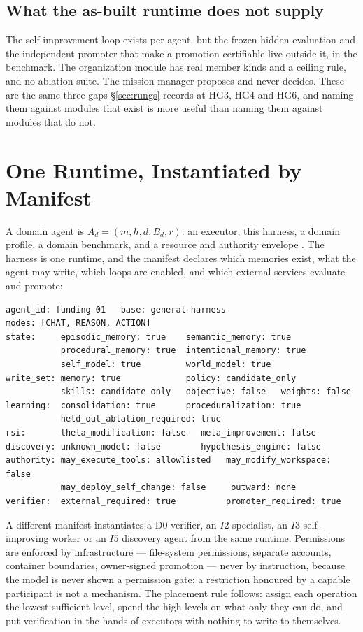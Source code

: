 \documentclass[11pt]{article}
\theoremstyle{definition}
\begin{document}
\subsection{What the as-built runtime does not supply}

The self-improvement loop exists per agent, but the frozen hidden evaluation and the independent promoter that make a promotion certifiable live outside it, in the benchmark. The organization module has real member kinds and a ceiling rule, and no ablation suite. The mission manager proposes and never decides. These are the same three gaps \S\ref{sec:rungs} records at HG3, HG4 and HG6, and naming them against modules that exist is more useful than naming them against modules that do not.

\section{One Runtime, Instantiated by Manifest}\label{sec:manifest}

A domain agent is $A_d = (m, h, d, B_d, r)$: an executor, this harness, a domain profile, a domain benchmark, and a resource and authority envelope \citep{yang2026plan}. The harness is one runtime, and the manifest declares which memories exist, what the agent may write, which loops are enabled, and which external services evaluate and promote:

{\small\begin{verbatim}
agent_id: funding-01   base: general-harness
modes: [CHAT, REASON, ACTION]
state:     episodic_memory: true    semantic_memory: true
           procedural_memory: true  intentional_memory: true
           self_model: true         world_model: true
write_set: memory: true             policy: candidate_only
           skills: candidate_only   objective: false   weights: false
learning:  consolidation: true      proceduralization: true
           held_out_ablation_required: true
rsi:       theta_modification: false   meta_improvement: false
discovery: unknown_model: false        hypothesis_engine: false
authority: may_execute_tools: allowlisted   may_modify_workspace: false
           may_deploy_self_change: false     outward: none
verifier:  external_required: true          promoter_required: true
\end{verbatim}}

A different manifest instantiates a D0 verifier, an $I2$ specialist, an $I3$ self-improving worker or an $I5$ discovery agent from the same runtime. Permissions are enforced by infrastructure --- file-system permissions, separate accounts, container boundaries, owner-signed promotion --- never by instruction, because the model is never shown a permission gate: a restriction honoured by a capable participant is not a mechanism. The placement rule follows: assign each operation the lowest sufficient level, spend the high levels on what only they can do, and put verification in the hands of executors with nothing to write to themselves.
\end{document}
